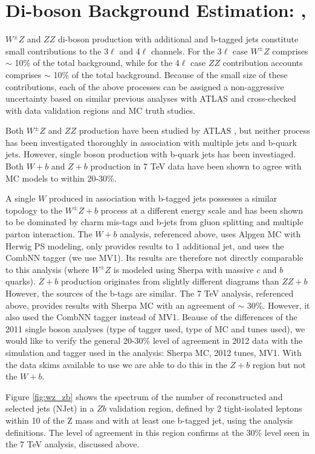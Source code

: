 \section{Di-boson Background Estimation: \WZ,\ZZ }

\label{section:wz}
$W^{\pm}Z$ and $ZZ$ di-boson production with additional and b-tagged jets constitute small contributions to 
the 3$\ell$ and 4$\ell$ channels. For the 3$\ell$ case $W^{\pm}Z$ comprises $\sim$ 10\% of the total background, while for
the 4$\ell$ case $ZZ$ contribution accounts comprises $\sim$ 10\% of the total background. 
Because of the small size of these contributions, each of the above processes can be assigned a 
non-aggressive uncertainty based on similar previous analyses with ATLAS and cross-checked with data validation 
regions and MC truth studies. 

Both $W^{\pm}Z$ and $ZZ$ production have been studied by ATLAS \cite{WZAtlas}\cite{ZZAtlas}, but neither process
has been investigated thoroughly in association with multiple jets and b-quark jets. However, single boson production with
b-quark jets has been investiaged. Both $W+b$ \cite{WbAtlas} 
and $Z+b$ \cite{ZbAtlas} production in 7 TeV data have been shown to agree with MC models to within 20-30\%. 

A single $W$ produced in association with b-tagged jets possesses a similar topology to the $W^{\pm}Z+b$ 
process at a different energy scale and has been shown to be dominated by charm mis-tags and b-jets from gluon splitting 
and multiple parton interaction. The $W+b$ analysis, referenced above, uses Alpgen MC with Herwig PS modeling, only provides
results to 1 additional jet, and uses the CombNN tagger (we use MV1). Its results are therefore not directly comparable to this \tth analysis (where $W^{\pm}Z$ is modeled using Sherpa with massive $c$ and $b$ quarks). $Z+b$ production originates from slightly different diagrams than $ZZ+b$ However, the sources of the b-tags are similar. The 7 TeV analysis, referenced above, provides results with Sherpa MC with an agreement of $\sim$ 30\%. However, it also used the CombNN tagger instead of MV1. Beause of the differences of the 2011 single boson analyses (type of tagger used, type of MC and tunes used), we would like to verify the general 20-30\% level of agreement in 2012 data with the simulation and tagger used in the \tth analysis: Sherpa MC, 2012 tunes, MV1. With the data skims available to use we are able to do this in the $Z+b$ region but not the $W+b$.  


Figure \ref{fig:wz_zb} shows the spectrum of the number of reconstructed and selected jets (NJet) in a 
$Zb$ validation region, defined by 2 tight-isolated leptons within 10 \gev of the Z mass and with at 
least one b-tagged jet, using the \tth analysis definitions. The level of agreement in this region confirms 
at the  30\% level seen in the 7 TeV analysis, discussed above. 

